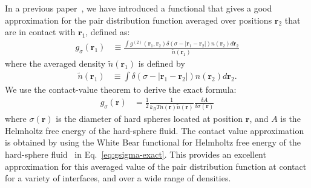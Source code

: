 \documentclass[letterpaper,twocolumn,amsmath,amssymb,pre,aps,10pt]{revtex4-1}
\newcommand{\rr}{\textbf{r}}
\begin{document}
In a previous paper~\cite{schulte2012using}, we have introduced a
functional that gives a good approximation for the pair distribution
function averaged over positions $\rr_2$ that are in contact with
$\rr_1$, defined as:
\begin{align}
  g_\sigma(\rr_1) &\equiv \frac{ \int g^{(2)}(\rr_1,\rr_2) \delta(\sigma -|\rr_1-\rr_2|)n(\rr_2)
    d\rr_2 }{ \tilde{n}(\rr_1)  }
\end{align}
where the averaged density $\tilde{n}(\rr_1)$ is defined by
\begin{align}
  \tilde{n}(\rr_1) &\equiv \int \delta(\sigma -|\rr_1 - \rr_2|)n(\rr_2) d\rr_2.
\end{align}
We use the contact-value theorem to derive the exact formula:
\begin{align}
  g_\sigma(\rr)%
  &= \frac12 \frac{1}{k_BT n(\rr) \tilde{n}(\rr)} \frac{\delta
    A}{\delta \sigma(\mathbf{r})} \label{eq:gsigma-exact}
\end{align}
where $\sigma(\rr)$ is the diameter of hard spheres located at
position $\rr$, and $A$ is the Helmholtz free energy of the
hard-sphere fluid.  The contact value approximation is obtained by
using the White Bear functional for Helmholtz free energy of the
hard-sphere fluid~\cite{roth2002whitebear} in
Eq.~\ref{eq:gsigma-exact}.  This provides an excellent approximation
for this averaged value of the pair distribution function at contact
for a variety of interfaces, and over a wide range of densities.
\end{document}
